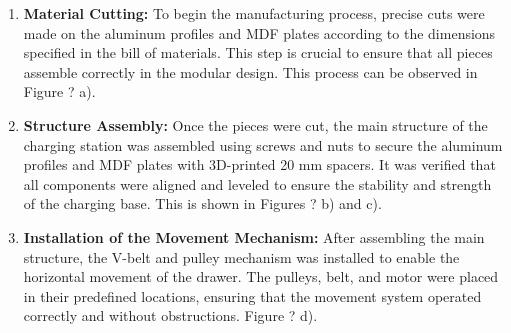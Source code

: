     \begin{enumerate}
        \item \textbf{Material Cutting:} To begin the manufacturing process, precise cuts were made on the aluminum profiles and MDF plates according to the dimensions specified in the bill of materials. This step is crucial to ensure that all pieces assemble correctly in the modular design. This process can be observed in Figure ? a).
            
        \item \textbf{Structure Assembly:} Once the pieces were cut, the main structure of the charging station was assembled using screws and nuts to secure the aluminum profiles and MDF plates with 3D-printed 20 mm spacers. It was verified that all components were aligned and leveled to ensure the stability and strength of the charging base. This is shown in Figures ? b) and c).
            
        \item \textbf{Installation of the Movement Mechanism:} After assembling the main structure, the V-belt and pulley mechanism was installed to enable the horizontal movement of the drawer. The pulleys, belt, and motor were placed in their predefined locations, ensuring that the movement system operated correctly and without obstructions. Figure ? d).
        
    \end{enumerate}

    


